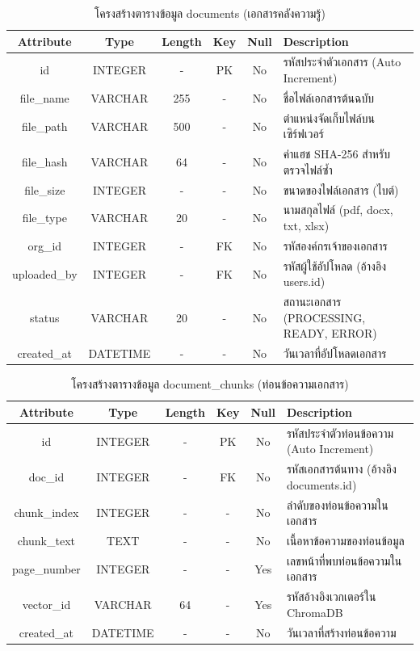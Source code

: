 \begin{table}[htbp]
\centering
\caption{โครงสร้างตารางข้อมูล documents (เอกสารคลังความรู้)}
\label{tab3:tb_docs}
\begin{tabularx}{\textwidth}{| c | c | c | c | c | L |}
\hline
\textbf{Attribute} & \textbf{Type} & \textbf{Length} & \textbf{Key} & \textbf{Null} & \textbf{Description} \\ \hline
id & INTEGER & - & PK & No & รหัสประจำตัวเอกสาร (Auto Increment) \\ \hline
file\_name & VARCHAR & 255 & - & No & ชื่อไฟล์เอกสารต้นฉบับ \\ \hline
file\_path & VARCHAR & 500 & - & No & ตำแหน่งจัดเก็บไฟล์บนเซิร์ฟเวอร์ \\ \hline
file\_hash & VARCHAR & 64 & - & No & ค่าแฮช SHA-256 สำหรับตรวจไฟล์ซ้ำ \\ \hline
file\_size & INTEGER & - & - & No & ขนาดของไฟล์เอกสาร (ไบต์) \\ \hline
file\_type & VARCHAR & 20 & - & No & นามสกุลไฟล์ (pdf, docx, txt, xlsx) \\ \hline
org\_id & INTEGER & - & FK & No & รหัสองค์กรเจ้าของเอกสาร \\ \hline
uploaded\_by & INTEGER & - & FK & No & รหัสผู้ใช้อัปโหลด (อ้างอิง users.id) \\ \hline
status & VARCHAR & 20 & - & No & สถานะเอกสาร (PROCESSING, READY, ERROR) \\ \hline
created\_at & DATETIME & - & - & No & วันเวลาที่อัปโหลดเอกสาร \\ \hline
\end{tabularx}
\end{table}

\begin{table}[htbp]
\centering
\caption{โครงสร้างตารางข้อมูล document\_chunks (ท่อนข้อความเอกสาร)}
\label{tab3:tb_chunks}
\begin{tabularx}{\textwidth}{| c | c | c | c | c | L |}
\hline
\textbf{Attribute} & \textbf{Type} & \textbf{Length} & \textbf{Key} & \textbf{Null} & \textbf{Description} \\ \hline
id & INTEGER & - & PK & No & รหัสประจำตัวท่อนข้อความ (Auto Increment) \\ \hline
doc\_id & INTEGER & - & FK & No & รหัสเอกสารต้นทาง (อ้างอิง documents.id) \\ \hline
chunk\_index & INTEGER & - & - & No & ลำดับของท่อนข้อความในเอกสาร \\ \hline
chunk\_text & TEXT & - & - & No & เนื้อหาข้อความของท่อนข้อมูล \\ \hline
page\_number & INTEGER & - & - & Yes & เลขหน้าที่พบท่อนข้อความในเอกสาร \\ \hline
vector\_id & VARCHAR & 64 & - & Yes & รหัสอ้างอิงเวกเตอร์ใน ChromaDB \\ \hline
created\_at & DATETIME & - & - & No & วันเวลาที่สร้างท่อนข้อความ \\ \hline
\end{tabularx}
\end{table}

